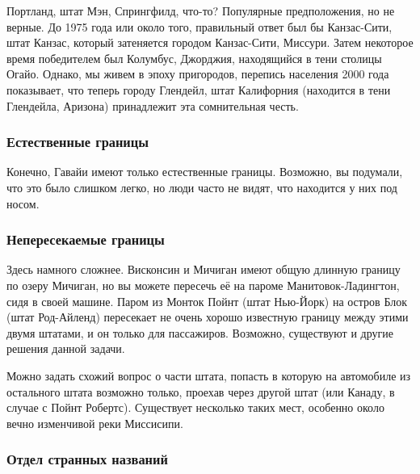 Портланд, штат Мэн, Спрингфилд, что-то?  Популярные предположения, но не верные.
До 1975 года или около того, правильный ответ был бы Канзас-Сити, штат Канзас, который затеняется городом Канзас-Сити, Миссури.
Затем некоторое время победителем был Колумбус, Джорджия, находящийся в тени столицы Огайо. Однако, мы живем в эпоху пригородов, %
перепись населения 2000 года показывает, что теперь городу Глендейл, штат Калифорния (находится в тени Глендейла, Аризона) принадлежит эта сомнительная %
честь.\heart




\subsubsection*{Естественные границы}%


Конечно, Гавайи  имеют только естественные границы. Возможно, вы подумали, что это было слишком легко, но люди часто не видят, что находится у них под носом. 
\heart




\subsubsection*{Непересекаемые границы}%


Здесь намного сложнее. Висконсин и Мичиган имеют общую длинную границу по озеру Мичиган, но вы можете пересечь её на пароме Манитовок-Ладингтон, сидя в своей машине. Паром из Монток Пойнт %
(штат Нью-Йорк) на остров Блок %
(штат Род-Айленд) пересекает не очень хорошо известную границу между этими двумя штатами, и он только для пассажиров. 
Возможно, существуют и другие решения данной задачи.\heart
                                                                                                                    


Можно задать схожий вопрос о части штата, попасть в которую на автомобиле из остального штата возможно только, проехав через другой штат (или Канаду, в случае с 
Пойнт Робертс). %
Существует несколько таких мест, особенно около вечно изменчивой реки Миссисипи.




\subsubsection*{Отдел странных названий}%


